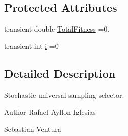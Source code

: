 \subsection*{Protected Attributes}
\begin{DoxyCompactItemize}
\item 
transient double \hyperlink{classnet_1_1sf_1_1jclec_1_1selector_1_1_stochastic_universal_sampling_ad110261827a129a7089916f339468a1a}{Total\-Fitness} =0.
\item 
transient int \hyperlink{classnet_1_1sf_1_1jclec_1_1selector_1_1_stochastic_universal_sampling_ae747f03bf49788753a9a248c98712145}{i} =0
\end{DoxyCompactItemize}


\subsection{Detailed Description}
Stochastic universal sampling selector.

\begin{DoxyAuthor}{Author}
Rafael Ayllon-\/\-Iglesias 

Sebastian Ventura 
\end{DoxyAuthor}


